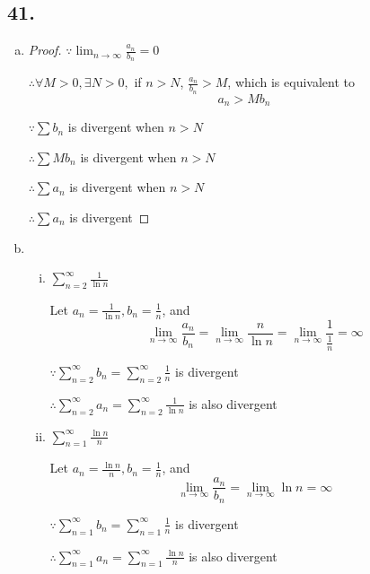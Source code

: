 \documentclass{article}
\begin{document}
    \subsection*{41.}

    \begin{enumerate}[(a)]
        \item \begin{proof}
            $\because \lim_{n\to\infty}\frac{a_n}{b_n} = 0$

            $\therefore \forall M > 0, \exists N > 0,$ if $n>N$, $\frac{a_n}{b_n} > M$, which is equivalent to $$a_n > Mb_n$$

            $\because \sum b_n$ is divergent when $n>N$

            $\therefore \sum Mb_n$ is divergent when $n>N$

            $\therefore \sum a_n$ is divergent when $n>N$

            $\therefore \sum a_n$ is divergent
        \end{proof}

        \item
        \begin{enumerate}[(i)]
            \item $\sum_{n=2}^\infty \frac{1}{\ln n}$

            Let $a_n = \frac{1}{\ln n}, b_n = \frac{1}{n}$, and $$\lim_{n\to\infty}\frac{a_n}{b_n} = \lim_{n\to\infty}\frac{n}{\ln n} = \lim_{n\to\infty}\frac{1}{\frac 1 n } = \infty$$

            $\because \sum_{n=2}^\infty b_n = \sum_{n=2}^\infty \frac 1 n$ is divergent

            $\therefore \sum_{n=2}^\infty a_n = \sum_{n=2}^\infty \frac{1}{\ln n}$ is also divergent

            \item $\sum_{n=1}^\infty \frac{\ln n}{n}$


            Let $a_n = \frac{\ln n}{n}, b_n = \frac{1}{n}$, and $$\lim_{n\to\infty}\frac{a_n}{b_n} = \lim_{n\to\infty}\ln n = \infty$$

            $\because \sum_{n=1}^\infty b_n = \sum_{n=1}^\infty \frac 1 n$ is divergent

            $\therefore \sum_{n=1}^\infty a_n = \sum_{n=1}^\infty \frac{\ln n}{n}$ is also divergent
        \end{enumerate}

    \end{enumerate}
    
\end{document}
